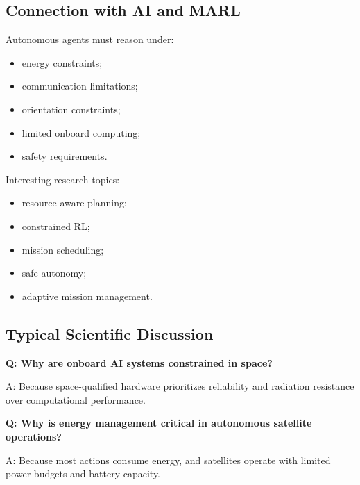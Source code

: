 \documentclass[10pt,a4paper,twocolumn]{article}
\begin{document}
\subsection{Connection with AI and MARL}

Autonomous agents must reason under:
\begin{itemize}
    \item energy constraints;
    \item communication limitations;
    \item orientation constraints;
    \item limited onboard computing;
    \item safety requirements.
\end{itemize}

Interesting research topics:
\begin{itemize}
    \item resource-aware planning;
    \item constrained RL;
    \item mission scheduling;
    \item safe autonomy;
    \item adaptive mission management.
\end{itemize}


\subsection{Typical Scientific Discussion}

\begin{questionbox}
    \textbf{Q: Why are onboard AI systems constrained in space?}

    A: Because space-qualified hardware prioritizes reliability and radiation resistance over computational performance.
\end{questionbox}

\begin{questionbox}
    \textbf{Q: Why is energy management critical in autonomous satellite operations?}

    A: Because most actions consume energy, and satellites operate with limited power budgets and battery capacity.
\end{questionbox}

\end{document}
